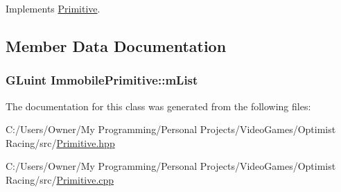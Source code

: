 Implements \hyperlink{class_primitive_aef765029fae092f0f6dd1507e18e72e0}{Primitive}.



\subsection{Member Data Documentation}
\hypertarget{class_immobile_primitive_ae8a9856047b36aad734a887fc8361610}{
\subsubsection[{m\-List}]{\setlength{\rightskip}{0pt plus 5cm}G\-Luint Immobile\-Primitive\-::m\-List\hspace{0.3cm}{\ttfamily [protected]}}}\label{class_immobile_primitive_ae8a9856047b36aad734a887fc8361610}


The documentation for this class was generated from the following files\-:\begin{DoxyCompactItemize}
\item 
C\-:/\-Users/\-Owner/\-My Programming/\-Personal Projects/\-Video\-Games/\-Optimist Racing/src/\hyperlink{_primitive_8hpp}{Primitive.\-hpp}\item 
C\-:/\-Users/\-Owner/\-My Programming/\-Personal Projects/\-Video\-Games/\-Optimist Racing/src/\hyperlink{_primitive_8cpp}{Primitive.\-cpp}\end{DoxyCompactItemize}
